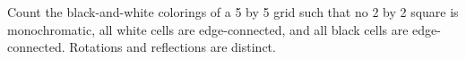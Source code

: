 Count the black-and-white colorings of a 5 by 5 grid such that no 2 by 2 square is monochromatic, all white cells are edge-connected, and all black cells are edge-connected. Rotations and reflections are distinct.

